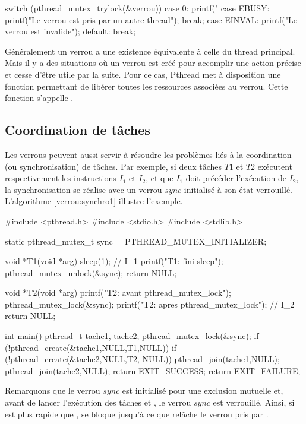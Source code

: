 \begin{codeblock}
switch (pthread_mutex_trylock(&verrou)) {
  case 0: printf("%
  case EBUSY: printf("Le verrou est pris par un autre thread\n"); break;
  case EINVAL: printf("Le verrou est invalide\n");
  default: break;
}
\end{codeblock}

Généralement un verrou a une existence équivalente à celle du thread principal. Mais il y a des situations où un verrou est créé pour accomplir une action précise et cesse d'être utile par la suite. Pour ce cas, Pthread met à disposition une fonction permettant de libérer toutes les ressources associées au verrou. Cette fonction s'appelle .

\subsection{Coordination de tâches}
Les verrous peuvent aussi servir à résoudre les problèmes liés à la coordination (ou synchronisation) de tâches.  Par exemple, si deux tâches $T1$ et $T2$ exécutent respectivement les instructions $I_1$ et $I_2$, et que $I_1$ doit précéder l'exécution de $I_2$, la synchronisation se réalise avec un verrou $sync$ initialisé à son état verrouillé.
L'algorithme \ref{verrou:synchro1} illustre l'exemple.

\begin{codeblock}[label=verrou:synchro1,title=Coordination de 2 tâches par un verrou]
#include <pthread.h>
#include <stdio.h>
#include <stdlib.h>

static pthread_mutex_t sync = PTHREAD_MUTEX_INITIALIZER;

void *T1(void *arg) {
  sleep(1);                                    // I_1
  printf("T1: fini sleep\n");
  pthread_mutex_unlock(&sync);
  return NULL;
}

void *T2(void *arg) {
  printf("T2: avant pthread_mutex_lock\n");
  pthread_mutex_lock(&sync);
  printf("T2: apres pthread_mutex_lock\n");   // I_2
  return NULL;
}

int main() {
  pthread_t tache1, tache2;
  pthread_mutex_lock(&sync);
  if (!pthread_create(&tache1,NULL,T1,NULL)) {
     if (!pthread_create(&tache2,NULL,T2, NULL)) {
        pthread_join(tache1,NULL);
        pthread_join(tache2,NULL);
        return EXIT_SUCCESS;
     }
  }
  return EXIT_FAILURE;
}
\end{codeblock}

Remarquons que le verrou $sync$ est initialisé pour une exclusion mutuelle et, avant de lancer l'exécution des tâches  et , le verrou $sync$ est verrouillé. Ainsi, si  est plus rapide que ,  se bloque jusqu'à ce que  relâche le verrou pris par .

